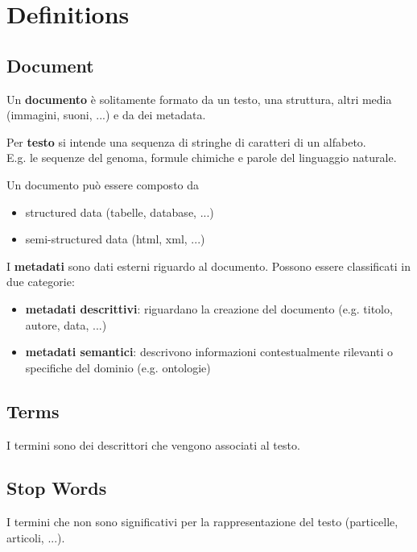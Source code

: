 \chapter{Definitions}

\section{Document}
Un \textbf{documento} è solitamente formato da un testo, una struttura, altri media (immagini, suoni, ...) e da dei metadata.

Per \textbf{testo} si intende una sequenza di stringhe di caratteri di un alfabeto.\\
E.g. le sequenze del genoma, formule chimiche e parole del linguaggio naturale. 

Un documento può essere composto da
\begin{itemize}
  \item structured data (tabelle, database, ...)
  \item semi-structured data (html, xml, ...)
\end{itemize}

I \textbf{metadati} sono dati esterni riguardo al documento. Possono essere classificati in due categorie:

\begin{itemize}
  \item \textbf{metadati descrittivi}: riguardano la creazione del documento (e.g. titolo, autore, data, ...)
  \item \textbf{metadati semantici}: descrivono informazioni contestualmente rilevanti o specifiche del dominio (e.g. ontologie)
\end{itemize}

\section{Terms}
I termini sono dei descrittori che vengono associati al testo.

\section{Stop Words}
I termini che non sono significativi per la rappresentazione del testo (particelle, articoli, ...).
